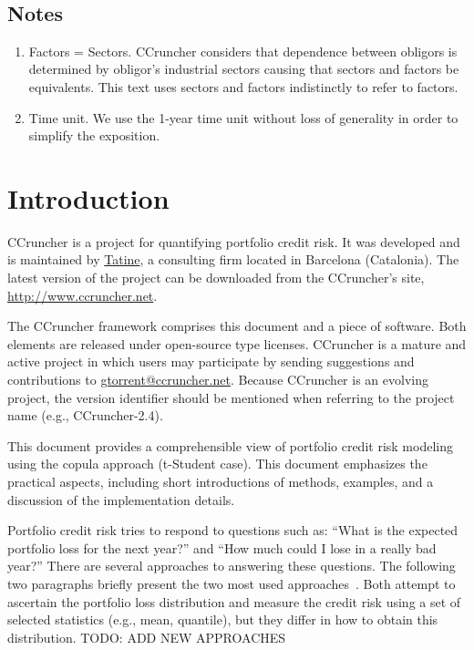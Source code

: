 \documentclass[11pt,fleqn]{book} %
\def\numversion{2.4}
\begin{document}
\glsaddall
\printglossary[style=super3colleft]
~\vfill
\section*{Notes}
\begin{enumerate}[leftmargin=*]
	\itemsep 0.5em
	\item Factors = Sectors. CCruncher considers that dependence between 
	obligors is determined by obligor's industrial sectors causing that 
	sectors and factors be equivalents. This text uses sectors and factors 
	indistinctly to refer to factors.
	\item Time unit. We use the 1-year time unit without loss of generality 
	in order to simplify the exposition.
\end{enumerate}
\cleardoublepage


\chapter{Introduction}

CCruncher is a project for quantifying portfolio credit risk. 
It was developed and is maintained by \href{http://www.tatine.es}{Tatine}, a 
consulting firm located in Barcelona (Catalonia). The latest version 
of the project can be downloaded from the CCruncher's site, 
\url{http://www.ccruncher.net}.

The CCruncher framework comprises this document and a piece of software. 
Both elements are released under open-source type licenses. 
CCruncher is a mature and active project in which users may participate by 
sending suggestions and contributions to \href{mailto:gtorrent@ccruncher.net}
{gtorrent@ccruncher.net}. Because CCruncher is an evolving project, the version
identifier should be mentioned when referring to the project name 
(e.g., CCruncher-\numversion).

This document provides a comprehensible view of portfolio credit risk modeling 
using the copula approach (t-Student case). This document emphasizes the 
practical aspects, including short introductions of methods, examples, and 
a discussion of the implementation details. 

Portfolio credit risk tries to respond to questions such as: ``What is the 
expected portfolio loss for the next year?'' and ``How much could I 
lose in a really bad year?'' There are several approaches to answering these 
questions. The following two paragraphs briefly present the two most used 
approaches~\cite{crouhy:2000}\cite[chap. 2.4]{bluhm:2002}. 
Both attempt to ascertain the portfolio loss distribution and measure 
the credit risk using a set of selected statistics (e.g., mean, quantile), 
but they differ in how to obtain this distribution. 
TODO: ADD NEW APPROACHES \cite{brereton:2012}
\end{document}
